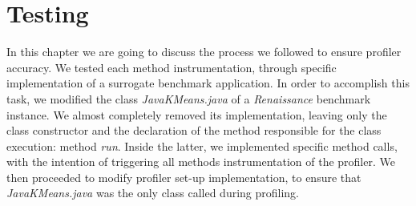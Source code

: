 \documentclass[]{usiinfthesis}
\begin{document}
\section{Testing} \label{sec:5.7}
In this chapter we are going to discuss the process we followed to ensure profiler accuracy. We tested each method instrumentation, through specific implementation of a surrogate benchmark application. In order to accomplish this task, we modified the class \textit{JavaKMeans.java} of a \textit{Renaissance} \cite{Renaissance} benchmark instance. We almost completely removed its implementation, leaving only the class constructor and the declaration of the method responsible for the class execution: method \textit{run}. Inside the latter, we implemented specific method calls, with the intention of triggering all methods instrumentation of the profiler. We then proceeded to modify profiler set-up implementation, to ensure that \textit{JavaKMeans.java} was the only class called during profiling.
\end{document}
